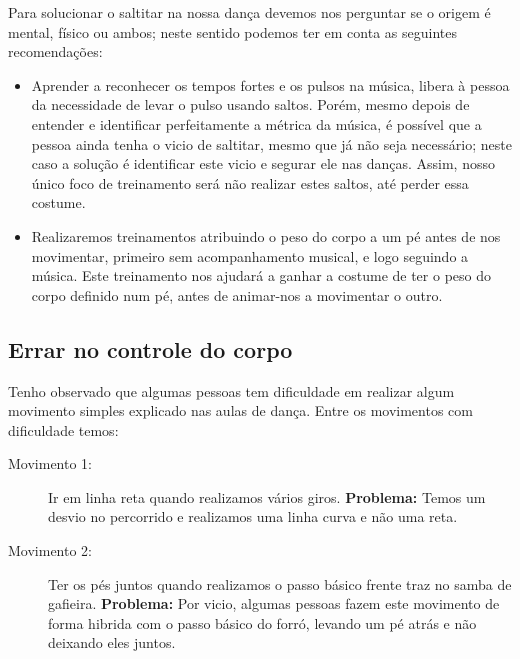 \begin{SolutionT}
Para solucionar o saltitar na nossa dança devemos nos perguntar se o origem é mental, físico ou ambos;
neste sentido podemos ter em conta as seguintes recomendações:
\begin{itemize}
\item  Aprender a reconhecer os tempos fortes e os pulsos na música, 
libera à pessoa da necessidade de levar o pulso usando saltos.
Porém, mesmo depois de entender e identificar perfeitamente a métrica da música,
é possível que a pessoa ainda tenha o vicio de saltitar, mesmo que já não seja necessário;
neste caso a solução é identificar este vicio e segurar ele nas danças. Assim, 
nosso único foco de treinamento será não realizar estes saltos, até perder essa costume.
\item  Realizaremos treinamentos atribuindo o peso do corpo a um pé 
antes de nos movimentar, primeiro sem acompanhamento musical,
e logo seguindo a música.
Este treinamento nos ajudará a ganhar a costume de ter o peso do corpo definido num pé,
antes de animar-nos a movimentar o outro. 
\end{itemize}
\end{SolutionT}




\subsection{Errar no controle do corpo}



Tenho observado que algumas pessoas tem dificuldade
em realizar algum movimento simples explicado nas aulas de dança.
Entre os movimentos com dificuldade temos:
\begin{description}
\item[Movimento 1:] Ir em linha reta quando realizamos vários giros.
\textbf{Problema:} Temos um desvio no percorrido e realizamos uma linha curva e não uma reta.
\item[Movimento 2:] Ter os pés juntos quando realizamos o passo básico frente traz no samba de gafieira.
\textbf{Problema:} Por vicio, algumas pessoas fazem este movimento de forma hibrida com o passo básico do forró,
levando um pé atrás e não deixando eles juntos.\\
\end{description} 


